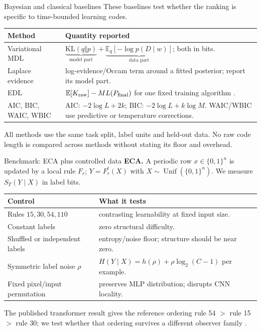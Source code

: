 \documentclass[aspectratio=43]{beamer}
\newcommand{\KL}{\mathrm{KL}}
\newcommand{\E}{\mathbb{E}}
\begin{document}
\begin{frame}{Bayesian and classical baselines}
These baselines test whether the ranking is specific to time-bounded learning codes.

\medskip
\scriptsize
\begin{tabular}{p{.22\linewidth}p{.69\linewidth}}
\toprule
Method & Quantity reported \\
\midrule
Variational MDL & $\underbrace{\KL(q\Vert p)}_{\text{model part}}+
\underbrace{\E_q[-\log p(D\mid w)]}_{\text{data part}}$; both in bits. \\
Laplace evidence & log-evidence/Occam term around a fitted posterior; report its model part. \\
EDL & $\E[K_{\rm raw}]-M L(P_{\rm final})$ for one fixed training algorithm \citep{donoway2026}. \\
AIC, BIC, WAIC, WBIC & AIC: $-2\log L+2k$; BIC: $-2\log L+k\log M$. WAIC/WBIC use predictive or temperature corrections. \\
\bottomrule
\end{tabular}

\medskip
All methods use the same task split, label units and held-out data. No raw code length is compared
across methods without stating its floor and overhead.
\end{frame}

\begin{frame}{Benchmark: ECA plus controlled data}
\textbf{ECA.} A periodic row $x\in\{0,1\}^n$ is updated by a local rule $F_r$;
$Y=F_r^t(X)$ with $X\sim\operatorname{Unif}(\{0,1\}^n)$. We measure $S_T(Y\mid X)$ in label bits.

\medskip
\begin{tabular}{p{.26\linewidth}p{.58\linewidth}}
\toprule
Control & What it tests \\
\midrule
Rules $15,30,54,110$ & contrasting learnability at fixed input size. \\
Constant labels & zero structural difficulty. \\
Shuffled or independent labels & entropy/noise floor; structure should be near zero. \\
Symmetric label noise $\rho$ & $H(Y\mid X)=h(\rho)+\rho\log_2(C-1)$ per example. \\
Fixed pixel/input permutation & preserves MLP distribution; disrupts CNN locality. \\
\bottomrule
\end{tabular}

\medskip
The published transformer result gives the reference ordering rule 54 $>$ rule 15 $>$ rule 30;
we test whether that ordering survives a different observer family \citep{finzi2026}.
\end{frame}
\end{document}
